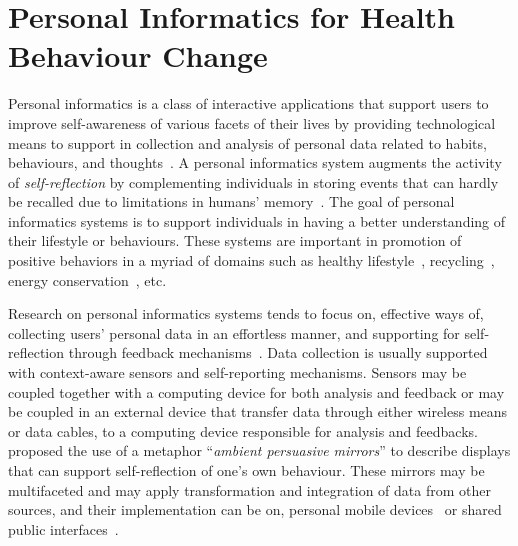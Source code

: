 \section{Personal Informatics for Health Behaviour Change}
Personal informatics is a class of interactive applications that support users to improve self-awareness of various facets of their lives by providing technological means to support in collection and analysis of personal data related to habits, behaviours, and thoughts~\citep{li2011personal,li2012personal}. A personal informatics system augments the activity of \emph{self-reflection} by complementing individuals in storing events that can hardly be recalled due to limitations in humans' memory~\citep{li2010stage}. The goal of personal informatics systems is to support individuals in having a better understanding of their lifestyle or behaviours. These systems are important in promotion of positive behaviors in a myriad of domains such as healthy lifestyle~\citep{korhonen2010personal}, recycling~\citep{comber2013designing}, energy conservation~\citep{seligman1977feedback}, etc. 

Research on personal informatics systems tends to focus on, effective ways of, collecting users' personal data in an effortless manner, and supporting for self-reflection through feedback mechanisms~\citep{li2011understanding}. Data collection is usually supported with context-aware sensors and self-reporting mechanisms. Sensors may be coupled together with a computing device for both analysis and feedback or may be coupled in an external device that transfer data through either wireless means or data cables, to a computing device responsible for analysis and feedbacks.~\cite{nakajima2013designing} proposed the use of a metaphor ``\emph{ambient persuasive mirrors}'' to describe displays that can support self-reflection of one's own behaviour. These mirrors may be multifaceted and may apply transformation and integration of data from other sources, and their implementation can be on, personal mobile devices~\citep{klasnja2009:using} or shared public interfaces~\citep{lin2006:fish}.

